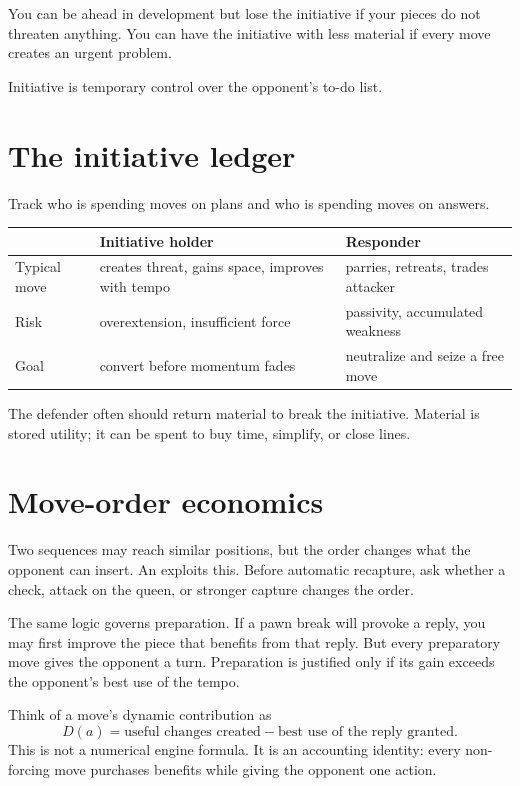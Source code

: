 You can be ahead in development but lose the initiative if your pieces do not threaten anything. You can have the initiative with less material if every move creates an urgent problem.

\begin{intuitionbox}
Initiative is temporary control over the opponent's to-do list.
\end{intuitionbox}

\section{The initiative ledger}
Track who is spending moves on plans and who is spending moves on answers.

\begin{center}
\begin{tabularx}{.9\textwidth}{p{}YY}
\toprule
& \textbf{Initiative holder} & \textbf{Responder}\\
\midrule
Typical move & creates threat, gains space, improves with tempo & parries, retreats, trades attacker\\
Risk & overextension, insufficient force & passivity, accumulated weakness\\
Goal & convert before momentum fades & neutralize and seize a free move\\
\bottomrule
\end{tabularx}
\end{center}

The defender often should return material to break the initiative. Material is stored utility; it can be spent to buy time, simplify, or close lines.

\section{Move-order economics}
Two sequences may reach similar positions, but the order changes what the opponent can insert. An  exploits this. Before automatic recapture, ask whether a check, attack on the queen, or stronger capture changes the order.

The same logic governs preparation. If a pawn break will provoke a reply, you may first improve the piece that benefits from that reply. But every preparatory move gives the opponent a turn. Preparation is justified only if its gain exceeds the opponent's best use of the tempo.

\begin{formalbox}
Think of a move's dynamic contribution as
\[
D(a)=\text{useful changes created}-\text{best use of the reply granted}.
\]
This is not a numerical engine formula. It is an accounting identity: every non-forcing move purchases benefits while giving the opponent one action.
\end{formalbox}

